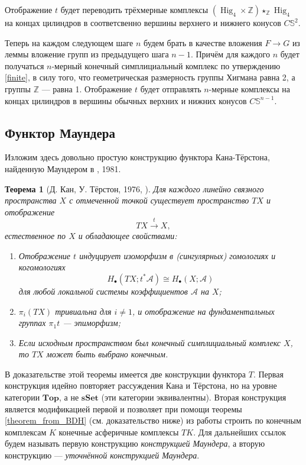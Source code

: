 \documentclass[14pt, dvipsnames, twoside]{extarticle}
\newtheorem{theorem}{Теорема}
\theoremstyle{definition}
\theoremstyle{remark}
\DeclareMathOperator{\Hig}{\mathrm{Hig}}
\begin{document}
Отображение $t$ будет переводить трёхмерные комплексы $(\Hig_4\times \mathbb{Z})\star_{\mathbb{Z}} \Hig_4$ на концах цилиндров в соответсвенно вершины верхнего и нижнего конусов $C\mathbb{S}^2$.  

Теперь на каждом следующем шаге $n$ будем брать в качестве вложения $F\to G$ из леммы вложение групп из предыдущего шага $n-1$. Причём для каждого $n$ будет получаться $n$-мерный конечный симплициальный комплекс по утверждению \ref{finite}, в силу того, что геометрическая размерность группы Хигмана равна 2, а группы $\mathbb{Z}$ --- равна 1. Отображение $t$ будет отправлять $n$-мерные комплексы на концах цилиндров в вершины обычных верхних и нижних конусов $C\mathbb{S}^{n-1}$.  
\fi













\subsection{Функтор Маундера}\label{Maunder}

Изложим здесь довольно простую конструкцию функтора Кана-Тёрстона, найденную Маундером в \cite{Maunder}, 1981. 


\begin{theorem}[Д. Кан, У. Тёрстон, 1976, \cite{Kan}]
Для каждого линейно связного пространства $X$ с отмеченной точкой существует пространство $TX$ и отображение $$TX\overset{t}{\to} X,$$ естественное по $X$ и обладающее свойствами:
\begin{enumerate}[\bf 1.]
\item Отображение $t$ индуцирует изоморфизм в (сингулярных) гомологиях и когомологиях $$H_\bullet(TX; t^\ast \mathcal{A})\cong H_\bullet(X; \mathcal{A})$$ для любой локальной системы коэффициентов $\mathcal{A}$ на $X$; 

\item $\pi_i(TX)$ тривиальна для $i\neq 1$, и отображение на фундаментальных группах $\pi_1t$ --- эпиморфизм;

\item Если исходным пространством был конечный симплициальный комплекс $X$, то $TX$ может быть выбрано конечным. \label{point3}
\end{enumerate}
\end{theorem}

В доказательстве этой теоремы имеется две конструкции функтора $T$. Первая конструкция идейно повторяет рассуждения Кана и Тёрстона, но на уровне категории $\mathbf{Top}$, а не $\mathbf{sSet}$ (эти категории эквивалентны). Вторая конструкция является модификацией первой и позволяет при помощи теоремы \ref{theorem_from_BDH} (см. доказательство ниже) из работы \cite{BDH} строить по конечным комплексам $K$ конечные асферичные комплексы $TK$. Для дальнейших ссылок будем называть первую конструкцию {\it конструкцией Маундера}, а вторую конструкцию --- {\it уточнённой конструкцией Маундера}.   
\end{document}
